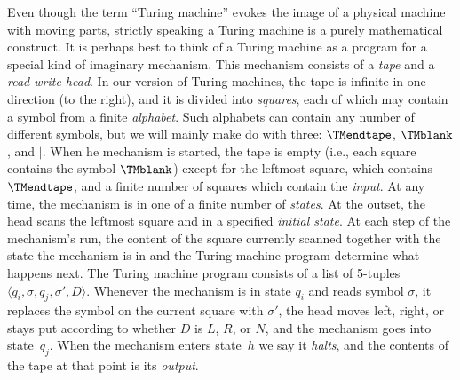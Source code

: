 \documentclass[../../../include/open-logic-section]{subfiles}
\begin{document}

\begin{explain}
Even though the term ``Turing machine'' evokes the image of a physical
machine with moving parts, strictly speaking a Turing machine is a
purely mathematical construct.  It is perhaps best to think of a
Turing machine as a program for a special kind of imaginary mechanism.
This mechanism consists of a \emph{tape} and a \emph{read-write head}.
In our version of Turing machines, the tape is infinite in one
direction (to the right), and it is divided into \emph{squares}, each
of which may contain a symbol from a finite \emph{alphabet}.  Such
alphabets can contain any number of different symbols, but we will
mainly make do with three: $\TMendtape$, $\TMblank$, and
$\mid$.  When he mechanism is started, the tape is empty (i.e., each
square contains the symbol $\TMblank$) except for the
leftmost square, which contains $\TMendtape$, and a finite number
of squares which contain the \emph{input}.  At any time, the mechanism
is in one of a finite number of \emph{states}.  At the outset, the
head scans the leftmost square and in a specified \emph{initial
  state}.  At each step of the mechanism's run, the content of the
square currently scanned together with the state the mechanism is in
and the Turing machine program determine what happens next.  The Turing
machine program consists of a list of 5-tuples $\langle q_i, \sigma,
q_j, \sigma', D\rangle$.  Whenever the mechanism is in state $q_i$ and
reads symbol $\sigma$, it replaces the symbol on the current square
with $\sigma'$, the head moves left, right, or stays put according to
whether $D$ is $L$, $R$, or $N$, and the mechanism goes into
state~$q_j$.  When the mechanism enters state~$h$ we say it
\emph{halts}, and the contents of the tape at that point is its
\emph{output}.
\end{explain}
\end{document}
